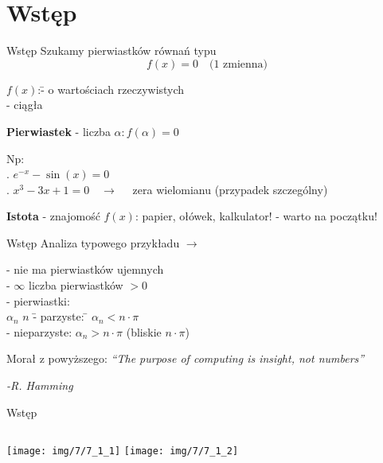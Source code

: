 \section{Wstęp}
\begin{frame}{Wstęp}
    Szukamy pierwiastków równań typu
    \[
    f(x) = 0 \quad \textrm{(1 zmienna)}
    \]
    \begin{tabbing}
	    $f(x)$:\quad \= - o wartościach rzeczywistych\\
	    \> - ciągła
    \end{tabbing}
	{\bf Pierwiastek} - liczba $\alpha : f(\alpha) = 0$
	\begin{tabbing}
		Np:\\
		. $e^{-x} - \sin(x) = 0$\\
		. $x^{3} - 3x + 1 = 0 \quad\rightarrow\quad$ zera wielomianu (przypadek szczególny)
	\end{tabbing}
	{\bf Istota} - znajomość $f(x)$: papier, ołówek, kalkulator! - warto na początku!
\end{frame}
\begin{frame}{Wstęp}
	Analiza typowego przykładu $\rightarrow$\linebreak
	\begin{tabbing}
		- nie ma pierwiastków ujemnych\\
		- $\infty$ liczba pierwiastków $> 0$\\
		- pierwiastki:\\
		\quad $\alpha_{n}$ \quad $n$ \=- parzyste: \qquad\= $\alpha_{n} < n \cdot \pi$\\
		\>- nieparzyste: \>$\alpha_{n} > n \cdot \pi$ \qquad (bliskie $n \cdot \pi$)
	\end{tabbing}
	\begin{block}{Morał z powyższego:}
		{\it ``The purpose of computing is insight, not numbers''}
		\begin{flushright}
			{\it -R. Hamming}
		\end{flushright}
	\end{block}
\end{frame}
\begin{frame}{Wstęp}
	\begin{columns}
		\centering   \texttt{[image: img/7/7\_1\_1]}
		\centering   \texttt{[image: img/7/7\_1\_2]}
	\end{columns}
\end{frame}

